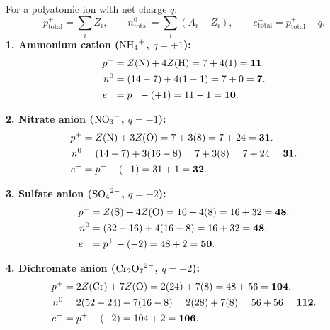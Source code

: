 \begin{solution}
For a polyatomic ion with net charge $q$:
\[
p^+_{\text{total}} = \sum_i Z_i, \qquad n^0_{\text{total}} = \sum_i (A_i - Z_i), \qquad e^-_{\text{total}} = p^+_{\text{total}} - q.
\]
\textbf{1. Ammonium cation ($\ce{NH4+}$, $q = +1$):}
\begin{align*}
p^+ &= Z(\ce{N}) + 4 Z(\ce{H}) = 7 + 4(1) = \mathbf{11}. \\
n^0 &= (14 - 7) + 4(1 - 1) = 7 + 0 = \mathbf{7}. \\
e^- &= p^+ - (+1) = 11 - 1 = \mathbf{10}.
\end{align*}

\textbf{2. Nitrate anion ($\ce{NO3-}$, $q = -1$):}
\begin{align*}
p^+ &= Z(\ce{N}) + 3 Z(\ce{O}) = 7 + 3(8) = 7 + 24 = \mathbf{31}. \\
n^0 &= (14 - 7) + 3(16 - 8) = 7 + 3(8) = 7 + 24 = \mathbf{31}. \\
e^- &= p^+ - (-1) = 31 + 1 = \mathbf{32}.
\end{align*}

\textbf{3. Sulfate anion ($\ce{SO4^{2-}}$, $q = -2$):}
\begin{align*}
p^+ &= Z(\ce{S}) + 4 Z(\ce{O}) = 16 + 4(8) = 16 + 32 = \mathbf{48}. \\
n^0 &= (32 - 16) + 4(16 - 8) = 16 + 32 = \mathbf{48}. \\
e^- &= p^+ - (-2) = 48 + 2 = \mathbf{50}.
\end{align*}

\textbf{4. Dichromate anion ($\ce{Cr2O7^{2-}}$, $q = -2$):}
\begin{align*}
p^+ &= 2 Z(\ce{Cr}) + 7 Z(\ce{O}) = 2(24) + 7(8) = 48 + 56 = \mathbf{104}. \\
n^0 &= 2(52 - 24) + 7(16 - 8) = 2(28) + 7(8) = 56 + 56 = \mathbf{112}. \\
e^- &= p^+ - (-2) = 104 + 2 = \mathbf{106}.
\end{align*}
\end{solution}

